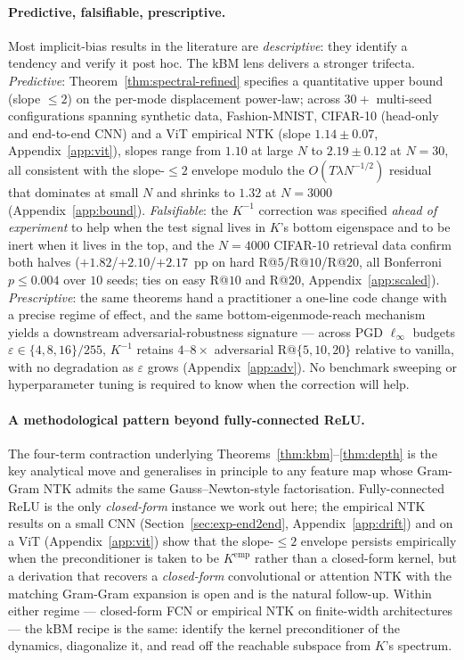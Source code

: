 \documentclass{article}
\begin{document}
\paragraph{Predictive, falsifiable, prescriptive.}
Most implicit-bias results in the literature are \emph{descriptive}:
they identify a tendency and verify it post hoc. The kBM lens delivers
a stronger trifecta. \emph{Predictive}: Theorem~\ref{thm:spectral-refined}
specifies a quantitative upper bound (slope $\leq 2$) on the per-mode
displacement power-law;
across $30+$ multi-seed configurations spanning synthetic data,
Fashion-MNIST, CIFAR-10 (head-only and end-to-end CNN) and a ViT
empirical NTK (slope $1.14 \pm 0.07$, Appendix~\ref{app:vit}),
slopes range from $1.10$ at large $N$ to $2.19 \pm 0.12$ at $N{=}30$,
all consistent with the slope-$\leq 2$ envelope modulo the
$O(T \lambda N^{-1/2})$ residual that dominates at small $N$ and
shrinks to $1.32$ at $N{=}3000$ (Appendix~\ref{app:bound}).
\emph{Falsifiable}: the $K^{-1}$ correction was specified \emph{ahead
of experiment} to help when the test signal lives in $K$'s bottom
eigenspace and to be inert when it lives in the top, and the
$N{=}4000$ CIFAR-10 retrieval data confirm both halves
($+1.82$/$+2.10$/$+2.17$~pp on hard R@$5$/R@$10$/R@$20$, all
Bonferroni $p \leq 0.004$ over $10$ seeds; ties on easy R@$10$ and
R@$20$, Appendix~\ref{app:scaled}). \emph{Prescriptive}: the same
theorems hand a practitioner a one-line code change with a precise
regime of effect, and the same bottom-eigenmode-reach mechanism
yields a downstream adversarial-robustness signature ---
across PGD $\ell_\infty$ budgets $\varepsilon\!\in\!\{4,8,16\}/255$,
$K^{-1}$ retains $4$--$8\times$ adversarial R@$\{5,10,20\}$ relative
to vanilla, with no degradation as $\varepsilon$ grows
(Appendix~\ref{app:adv}). No benchmark sweeping or hyperparameter
tuning is required to know when the correction will help.

\paragraph{A methodological pattern beyond fully-connected ReLU.}
The four-term contraction underlying
Theorems~\ref{thm:kbm}--\ref{thm:depth} is the key analytical move and
generalises in principle to any feature map whose Gram-Gram NTK admits
the same Gauss--Newton-style factorisation. Fully-connected ReLU is
the only \emph{closed-form} instance we work out here; the empirical
NTK results on a small CNN (Section~\ref{sec:exp-end2end},
Appendix~\ref{app:drift}) and on a ViT (Appendix~\ref{app:vit}) show
that the slope-$\leq 2$ envelope persists empirically when the
preconditioner is taken to be $K^{\mathrm{emp}}$ rather than a
closed-form kernel, but a derivation that recovers a
\emph{closed-form} convolutional or attention NTK with the matching
Gram-Gram expansion is open and is the natural follow-up. Within
either regime --- closed-form FCN or empirical NTK on
finite-width architectures --- the kBM recipe is the same: identify
the kernel preconditioner of the dynamics, diagonalize it, and read
off the reachable subspace from $K$'s spectrum.
\end{document}
